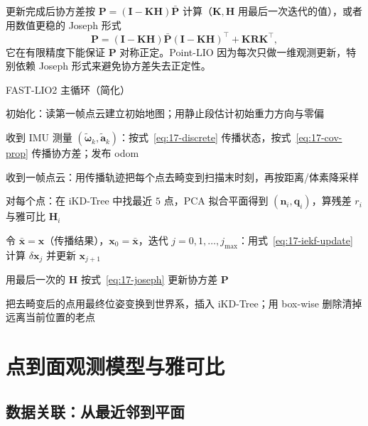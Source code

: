 更新完成后协方差按 $\bm{P}=(\bm{I}-\bm{K}\bm{H})\bar{\bm{P}}$ 计算（$\bm{K},\bm{H}$ 用最后一次迭代的值），或者用数值更稳的 Joseph 形式
\begin{equation}\label{eq:17-joseph}
  \bm{P}=(\bm{I}-\bm{K}\bm{H})\bar{\bm{P}}(\bm{I}-\bm{K}\bm{H})^{\top}+\bm{K}\bm{R}\bm{K}^{\top},
\end{equation}
它在有限精度下能保证 $\bm{P}$ 对称正定。Point-LIO 因为每次只做一维观测更新，特别依赖 Joseph 形式来避免协方差失去正定性。

\begin{pseudo}{FAST-LIO2 主循环（简化）}
  \item 初始化：读第一帧点云建立初始地图；用静止段估计初始重力方向与零偏
  \item 收到 IMU 测量 $(\tilde{\bm{\omega}}_k,\tilde{\bm{a}}_k)$：按式~\eqref{eq:17-discrete} 传播状态，按式~\eqref{eq:17-cov-prop} 传播协方差；发布 odom
  \item 收到一帧点云：用传播轨迹把每个点去畸变到扫描末时刻，再按距离/体素降采样
  \item 对每个点：在 iKD-Tree 中找最近 $5$ 点，PCA 拟合平面得到 $(\bm{n}_i,\bm{q}_i)$，算残差 $r_i$ 与雅可比 $\bm{H}_i$
  \item 令 $\bar{\bm{x}}=\bm{x}$（传播结果），$\bm{x}_0=\bar{\bm{x}}$，迭代 $j=0,1,\dots,j_{\max}$：用式~\eqref{eq:17-iekf-update} 计算 $\delta\bm{x}_j$ 并更新 $\bm{x}_{j+1}$
  \item 用最后一次的 $\bm{H}$ 按式~\eqref{eq:17-joseph} 更新协方差 $\bm{P}$
  \item 把去畸变后的点用最终位姿变换到世界系，插入 iKD-Tree；用 box-wise 删除清掉远离当前位置的老点
\end{pseudo}

\section{点到面观测模型与雅可比}\label{sec:17-jacobian}

\subsection{数据关联：从最近邻到平面}

